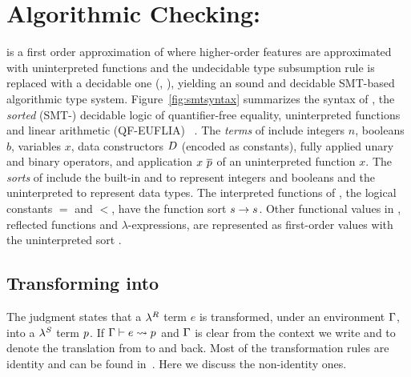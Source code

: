 \section{Algorithmic Checking: \smtlan}
\label{sec:theory:algorithmic}
\label{sec:algorithmic}

\smtlan is a first order approximation of \corelan
where higher-order features are
approximated with uninterpreted functions and the undecidable
type subsumption rule \rsubbasecore is replaced with a
decidable one (\ie, \rsubbasepbe), yielding an sound
and decidable SMT-based algorithmic type system.
%
Figure~\ref{fig:smtsyntax} summarizes the syntax
of \smtlan, the \emph{sorted} (SMT-)
decidable logic of quantifier-free equality,
uninterpreted functions and linear
arithmetic (QF-EUFLIA) ~\citep{Nelson81,SMTLIB2}.
%
The \emph{terms} of \smtlan include
integers $n$,
booleans $b$,
variables $x$,
data constructors $D$ (encoded as constants),
fully applied unary \unop and binary \binop operators,
and application $x\ \overline{p}$ of an uninterpreted function $x$.
%
The \emph{sorts} of \smtlan include the built-in
\tint and \tbool to represent
integers and booleans and the 
uninterpreted \tuniv to represent data types.
%
The interpreted functions of \smtlan, \eg
the logical constants $=$ and $<$,
have the function sort $s \rightarrow s$.
%
Other functional values in \corelan, \eg
reflected \corelan functions and
$\lambda$-expressions, are represented as
first-order values with
the uninterpreted sort \tsmtfun{\sort}{\sort}.


\subsection{Transforming \corelan into \smtlan}
%
\label{subsec:embedding}
\label{subsec:measures}

The judgment
states that a $\lambda^{R}$ term $e$ is transformed,
under an environment $\Gamma$, into a
$\lambda^{\mathit{S}}$ term $p$.
%
If ${ \Gamma\vdash e \rightsquigarrow p }$
and $\Gamma$ is clear from the context we write
 and \tohaskell{\pred}
to denote the translation from \corelan to \smtlan and back.
%
Most of the transformation rules are identity
and can be found in~\cite{appendix}.
Here we discuss the non-identity ones.

